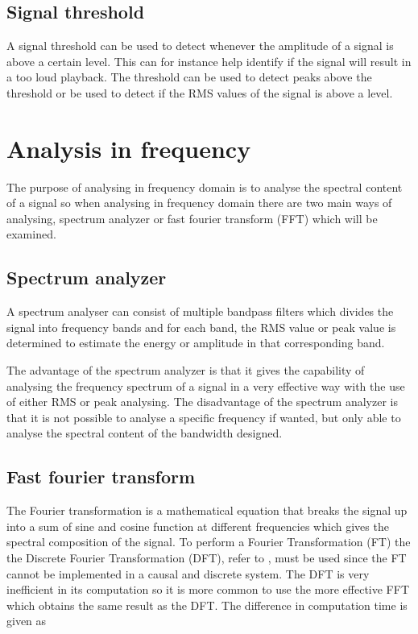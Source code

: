 \subsection*{Signal threshold}
A signal threshold can be used to detect whenever the amplitude of a signal is above a certain level. This can for instance help identify if the signal will result in a too loud playback. The threshold can be used to detect peaks above the threshold or be used to detect if the RMS values of the signal is above a level.

\section{Analysis in frequency} \label{sec:SignalFreq}
The purpose of analysing in frequency domain is to analyse the spectral content of a signal so when analysing in frequency domain there are two main ways of analysing, spectrum analyzer or fast fourier transform (FFT) which will be examined.

\subsection*{Spectrum analyzer}
A spectrum analyser can consist of multiple bandpass filters which divides the signal into frequency bands and for each band, the RMS value or peak value is determined to estimate the energy or amplitude in that corresponding band. %

The advantage of the spectrum analyzer is that it gives the capability of analysing the frequency spectrum of a signal in a very effective way with the use of either RMS or peak analysing. The disadvantage of the spectrum analyzer is that it is not possible to analyse a specific frequency if wanted, but only able to analyse the spectral content of the bandwidth designed.      

\subsection*{Fast fourier transform}
The Fourier transformation is a mathematical equation that breaks the signal up into a sum of sine and cosine function at different frequencies which gives the spectral composition of the signal. To perform a Fourier Transformation (FT) the the Discrete Fourier Transformation (DFT), refer to , must be used since the FT cannot be implemented in a causal and discrete system. The DFT is very inefficient in its computation so it is more common to use the more effective FFT which obtains the same result as the DFT. The difference in computation time is given as

